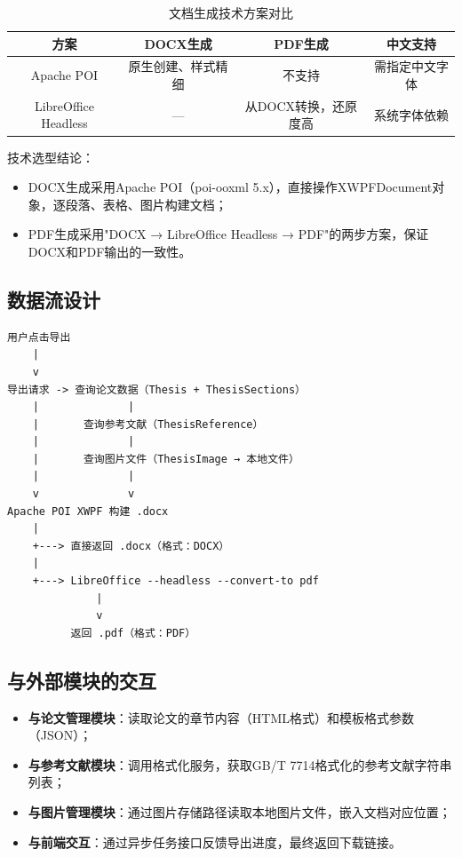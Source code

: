 \documentclass{../../softeng}
\begin{document}
\begin{table}[htbp]
\centering
\caption{文档生成技术方案对比}
\label{tab:export_compare}
\begin{tabular}{|c|c|c|c|}
\hline
\textbf{方案} & \textbf{DOCX生成} & \textbf{PDF生成} & \textbf{中文支持} \\
\hline
Apache POI & 原生创建、样式精细 & 不支持 & 需指定中文字体 \\
\hline
LibreOffice Headless & — & 从DOCX转换，还原度高 & 系统字体依赖 \\
\hline
\end{tabular}
\end{table}

技术选型结论：
\begin{itemize}
    \item DOCX生成采用Apache POI（poi-ooxml 5.x），直接操作XWPFDocument对象，逐段落、表格、图片构建文档；
    \item PDF生成采用"DOCX → LibreOffice Headless → PDF"的两步方案，保证DOCX和PDF输出的一致性。
\end{itemize}

\subsection{数据流设计}

\begin{verbatim}
用户点击导出
    |
    v
导出请求 -> 查询论文数据（Thesis + ThesisSections）
    |              |
    |       查询参考文献（ThesisReference）
    |              |
    |       查询图片文件（ThesisImage → 本地文件）
    |              |
    v              v
Apache POI XWPF 构建 .docx
    |
    +---> 直接返回 .docx（格式：DOCX）
    |
    +---> LibreOffice --headless --convert-to pdf
              |
              v
          返回 .pdf（格式：PDF）
\end{verbatim}

\subsection{与外部模块的交互}

\begin{itemize}
    \item \textbf{与论文管理模块}：读取论文的章节内容（HTML格式）和模板格式参数（JSON）；
    \item \textbf{与参考文献模块}：调用格式化服务，获取GB/T 7714格式化的参考文献字符串列表；
    \item \textbf{与图片管理模块}：通过图片存储路径读取本地图片文件，嵌入文档对应位置；
    \item \textbf{与前端交互}：通过异步任务接口反馈导出进度，最终返回下载链接。
\end{itemize}
\end{document}
